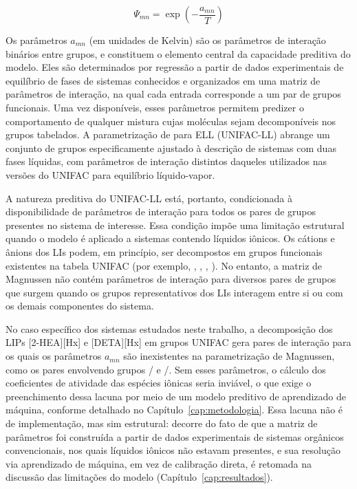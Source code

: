 \begin{equation}
    \Psi_{mn} = \exp\!\left(-\frac{a_{mn}}{T}\right)
    \label{eq:psi_unifac}
\end{equation}

Os parâmetros $a_{mn}$ (em unidades de Kelvin) são os parâmetros de interação binários entre grupos, e constituem o elemento central da capacidade preditiva do modelo. Eles são determinados por regressão a partir de dados experimentais de equilíbrio de fases de sistemas conhecidos e organizados em uma matriz de parâmetros de interação, na qual cada entrada corresponde a um par de grupos funcionais\cite{magnussen1981}. Uma vez disponíveis, esses parâmetros permitem predizer o comportamento de qualquer mistura cujas moléculas sejam decomponíveis nos grupos tabelados. A parametrização de  para ELL (UNIFAC-LL) abrange um conjunto de grupos especificamente ajustado à descrição de sistemas com duas fases líquidas, com parâmetros de interação distintos daqueles utilizados nas versões do UNIFAC para equilíbrio líquido-vapor.


A natureza preditiva do UNIFAC-LL está, portanto, condicionada à disponibilidade de parâmetros de interação para todos os pares de grupos presentes no sistema de interesse. Essa condição impõe uma limitação estrutural quando o modelo é aplicado a sistemas contendo líquidos iônicos. Os cátions e ânions dos LIs podem, em princípio, ser decompostos em grupos funcionais existentes na tabela UNIFAC (por exemplo, , , , ). No entanto, a matriz de Magnussen não contém parâmetros de interação para diversos pares de grupos que surgem quando os grupos representativos dos LIs interagem entre si ou com os demais componentes do sistema\cite{bahadur2015}.

No caso específico dos sistemas estudados neste trabalho, a decomposição dos LIPs [2-HEA][Hx] e [DETA][Hx] em grupos UNIFAC gera pares de interação para os quais os parâmetros $a_{mn}$ são inexistentes na parametrização de Magnussen, como os pares envolvendo grupos / e /. Sem esses parâmetros, o cálculo dos coeficientes de atividade das espécies iônicas seria inviável, o que exige o preenchimento dessa lacuna por meio de um modelo preditivo de aprendizado de máquina, conforme detalhado no Capítulo~\ref{cap:metodologia}. Essa lacuna não é de implementação, mas sim estrutural: decorre do fato de que a matriz de parâmetros foi construída a partir de dados experimentais de sistemas orgânicos convencionais, nos quais líquidos iônicos não estavam presentes\cite{bahadur2015,magnussen1981}, e sua resolução via aprendizado de máquina, em vez de calibração direta, é retomada na discussão das limitações do modelo (Capítulo~\ref{cap:resultados}).

